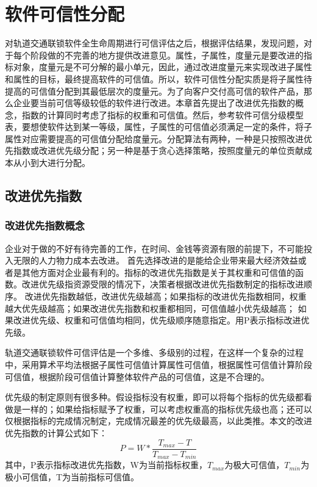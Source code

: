 \chapter{软件可信性分配}
\label{ch4}

\begin{kaishu}
对轨道交通联锁软件全生命周期进行可信评估之后，根据评估结果，发现问题，对于每个阶段做的不完善的地方提供改进意见。属性，子属性，度量元是要改进的指标对象，度量元是不可分解的最小单元，因此，通过改进度量元来实现改进子属性和属性的目标，最终提高软件的可信值。所以，软件可信性分配实质是将子属性待提高的可信值分配到其最低层次的度量元。为了向客户交付高可信的软件产品，那么企业要当前可信等级较低的软件进行改进。本章首先提出了改进优先指数的概念，指数的计算同时考虑了指标的权重和可信值。然后，参考软件可信分级模型表，要想使软件达到某一等级，属性，子属性的可信值必须满足一定的条件，将子属性对应需要提高的可信值分配给度量元。分配算法有两种，一种是只按照改进优先指数或改进优先级分配；另一种是基于贪心选择策略，按照度量元的单位贡献成本从小到大进行分配。
\end{kaishu}

\section{改进优先指数}
\subsection{改进优先指数概念}
企业对于做的不好有待完善的工作，在时间、金钱等资源有限的前提下，不可能投入无限的人力物力成本去改进。
首先选择改进的是能给企业带来最大经济效益或者是其他方面对企业最有利的。指标的改进优先指数是关于其权重和可信值的函数。改进优先级指资源受限的情况下，决策者根据改进优先指数制定的指标改进顺序。
改进优先指数越低，改进优先级越高；如果指标的改进优先指数相同，权重越大优先级越高；如果改进优先指数和权重都相同，可信值越小优先级越高；
如果改进优先级、权重和可信值均相同，优先级顺序随意指定。用P表示指标改进优先级。

轨道交通联锁软件可信评估是一个多维、多级别的过程，在这样一个复杂的过程中，采用算术平均法根据子属性可信值计算属性可信值，根据属性可信值计算阶段可信值，根据阶段可信值计算整体软件产品的可信值，这是不合理的。

优先级的制定原则有很多种。假设指标没有权重，即可以将每个指标的优先级都看做是一样的；如果给指标赋予了权重，可以考虑权重高的指标优先级也高；还可以仅根据指标的完成情况制定，完成情况最差的优先级最高，以此类推。本文的改进优先指数的计算公式如下：
\begin{equation}
    P=W*\frac{T_{max}-T}{T_{max}-T_{min}}
\end{equation}
其中，P表示指标改进优先指数，W为当前指标权重，$T_{max}$为极大可信值，$T_{min}$为极小可信值，T为当前指标可信值。

